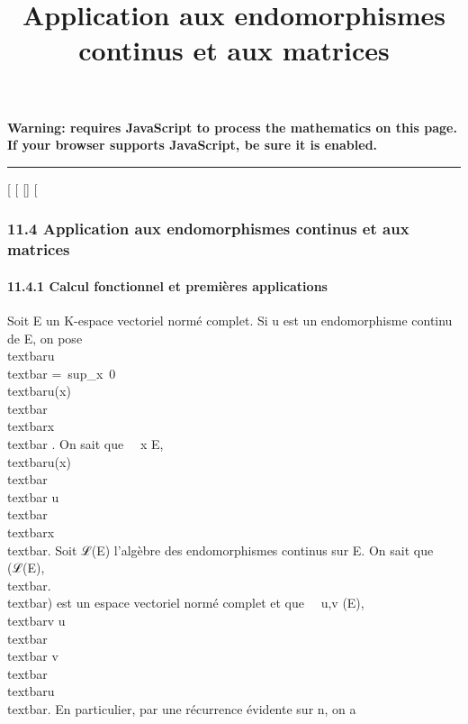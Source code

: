 \documentclass[]{article}
\title{Application aux endomorphismes continus et aux matrices}
\author{}
\date{}
\begin{document}
\maketitle

\textbf{Warning: 
requires JavaScript to process the mathematics on this page.\\ If your
browser supports JavaScript, be sure it is enabled.}

\begin{center}\rule{3in}{0.4pt}\end{center}

{[}
{[}
{[}{]}
{[}

\subsubsection{11.4 Application aux endomorphismes continus et aux
matrices}

\paragraph{11.4.1 Calcul fonctionnel et premières applications}

Soit E un K-espace vectoriel normé complet. Si u est un endomorphisme
continu de E, on pose
\\textbar{}u\\textbar{}
=\
sup\_x\neq~0
\\textbar{}u(x)\\textbar{}
\over
\\textbar{}x\\textbar{} . On sait que
\forall~~x \in E,
\\textbar{}u(x)\\textbar{}
\leq\\textbar{}
u\\textbar{}\,\\textbar{}x\\textbar{}.
Soit ℒ(E) l'algèbre des endomorphismes continus sur E. On sait que
(ℒ(E),\\textbar{}.\\textbar{}) est un
espace vectoriel normé complet et que \forall~~u,v
(E), \\textbar{}v \cdot u\\textbar{}
\leq\\textbar{}
v\\textbar{}\,\\textbar{}u\\textbar{}.
En particulier, par une récurrence évidente sur n, on a
\end{document}
